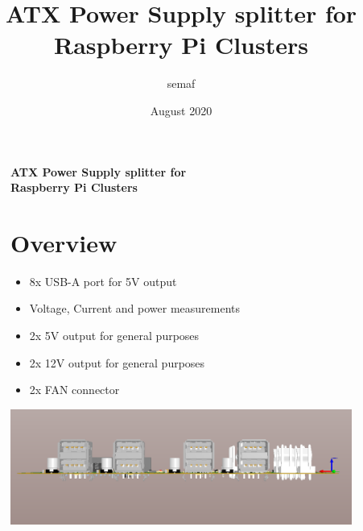 \documentclass[a4paper,14pt,oneside,pdflatex,english,final,twocolumn]{article}
\title{ATX Power Supply splitter for Raspberry Pi Clusters}
\author{semaf}
\date{August 2020}
\begin{document}
\pagestyle{fancy}

\chead {\today}

\onecolumn

\begin{figure}[ht]
	\begin{minipage}{1.0\textwidth}
		\raggedleft
		\Huge \textbf{ATX Power Supply splitter for} \\
		\Huge \textbf{Raspberry Pi Clusters}
	\end{minipage}

	\vspace{1cm}
	\begin{minipage}{0.47\textwidth}

		\section{Overview}
		\begin{itemize}
			\item 8x USB-A port for 5V output
			\item Voltage, Current and power measurements
			\item 2x 5V output for general purposes
			\item 2x 12V output for general purposes
			\item 2x FAN connector
		\end{itemize}


	\end{minipage}
	\hfill
	\begin{minipage}{0.47\textwidth}
		\centering
		\includegraphics[width=1.0\textwidth,right]{img/Alt_USB.png}

	\end{minipage} \\
	\vspace{1cm}


\end{figure}
\end{document}
